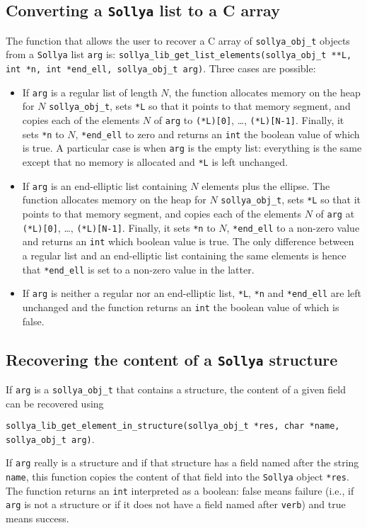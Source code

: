 \documentclass[a4paper]{article}
\newcommand{\sollya}{\texttt{Sollya}\xspace}
\begin{document}
\subsection{Converting a \sollya list to a C array}
The function that allows the user to recover a C array of \verb|sollya_obj_t| objects from a \sollya list \verb|arg| is:
\verb|sollya_lib_get_list_elements(sollya_obj_t **L, int *n, int *end_ell, sollya_obj_t arg)|.
Three cases are possible:
\begin{itemize}
\item If \verb|arg| is a regular list of length $N$, the function allocates memory on the heap for $N$ \verb|sollya_obj_t|, sets \verb|*L| so that it points to that memory segment, and copies each of the elements $N$ of \verb|arg| to \verb|(*L)[0]|, \dots, \verb|(*L)[N-1]|. Finally, it sets \verb|*n| to $N$, \verb|*end_ell| to zero and returns an \verb|int| the boolean value of which is true. A particular case is when \verb|arg| is the empty list: everything is the same except that no memory is allocated and \verb|*L| is left unchanged.
\item If \verb|arg| is an end-elliptic list containing $N$ elements plus the ellipse. The function allocates memory on the heap for $N$ \verb|sollya_obj_t|, sets \verb|*L| so that it points to that memory segment, and copies each of the elements $N$ of \verb|arg| at \verb|(*L)[0]|, \dots, \verb|(*L)[N-1]|. Finally, it sets \verb|*n| to $N$, \verb|*end_ell| to a non-zero value and returns an \verb|int| which boolean value is true. The only difference between a regular list and an end-elliptic list containing the same elements is hence that \verb|*end_ell| is set to a non-zero value in the latter.
\item If \verb|arg| is neither a regular nor an end-elliptic list, \verb|*L|, \verb|*n| and \verb|*end_ell| are left unchanged and the function returns an \verb|int| the boolean value of which is false.
\end{itemize}

\subsection{Recovering the content of a \sollya structure}
If \verb|arg| is a \verb|sollya_obj_t| that contains a structure, the content of a given field can be recovered using
\begin{center}
\verb|sollya_lib_get_element_in_structure(sollya_obj_t *res, char *name, sollya_obj_t arg)|.
\end{center}
If \verb|arg| really is a structure and if that structure has a field named after the string \verb|name|, this function copies the content of that field into the \sollya object \verb|*res|. The function returns an \verb|int| interpreted as a boolean: false means failure (i.e., if \verb|arg| is not a structure or if it does not have a field named after \verb|verb|) and true means success.
\end{document}
